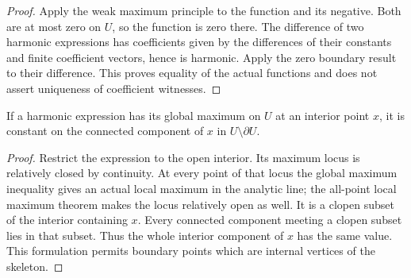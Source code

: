 \begin{proof}
Apply the weak maximum principle to the function and its negative. Both are
at most zero on $U$, so the function is zero there. The difference of two
harmonic expressions has coefficients given by the differences of their
constants and finite coefficient vectors, hence is harmonic. Apply the zero
boundary result to their difference. This proves equality of the actual
functions and does not assert uniqueness of coefficient witnesses.
\end{proof}

\begin{theorem}\label{thm:fc-harmonic-component-maximum}
\leanok
{}
If a harmonic expression has its global maximum on $U$ at an interior point
$x$, it is constant on the connected component of $x$ in
$U\setminus\partial U$.
\end{theorem}

\begin{proof}
Restrict the expression to the open interior. Its maximum locus is relatively
closed by continuity. At every point of that locus the global maximum
inequality gives an actual local maximum in the analytic line; the all-point
local maximum theorem makes the locus relatively open as well. It is a
clopen subset of the interior containing $x$. Every connected component
meeting a clopen subset lies in that subset. Thus the whole interior
component of $x$ has the same value. This formulation permits boundary
points which are internal vertices of the skeleton.
\end{proof}
